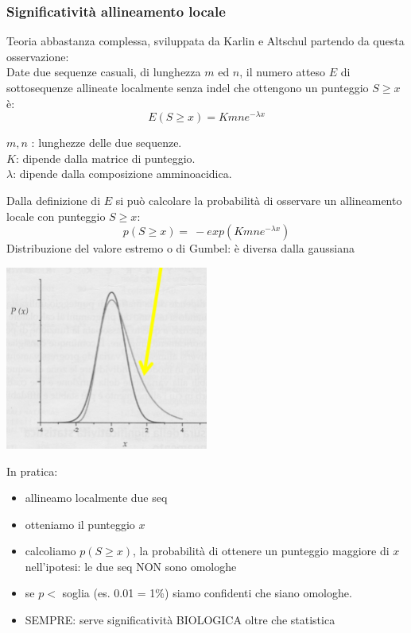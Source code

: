 \documentclass{article}
\begin{document}
\subsubsection{Significatività allineamento locale}
Teoria abbastanza complessa, sviluppata da Karlin e Altschul partendo da questa
osservazione:\\
Date due sequenze casuali, di lunghezza $m$ ed $n$, il numero atteso $E$ di
sottosequenze allineate localmente senza indel che ottengono un punteggio $S \geq x$ è:
$$E(S \geq x) = Kmne^{-\lambda x}$$
\begin{center}
    $m,n$ : lunghezze delle due sequenze.\\
    $K$: dipende dalla matrice di punteggio.\\
    $\lambda$: dipende dalla composizione amminoacidica.
\end{center}
Dalla definizione di $E$ si può calcolare la probabilità di osservare un
allineamento locale con punteggio $S \geq x$:
$$p(S \geq x) = \ - exp(Kmne^{- \lambda x})$$
Distribuzione del valore estremo o di Gumbel: è diversa dalla gaussiana
\begin{center}
    \includegraphics[width=0.5\textwidth]{figures/E.png}\\
\end{center}
In pratica:
\begin{itemize}
    \item allineamo localmente due seq
    \item otteniamo il punteggio $x$
    \item calcoliamo $p(S \geq x)$, la probabilità di
    ottenere un punteggio maggiore di $x$
    nell'ipotesi: le due seq NON sono
    omologhe
    \item se $p < $ soglia (es. 0.01 = 1\%) siamo
    confidenti che siano omologhe.
    \item SEMPRE: serve significatività
    BIOLOGICA oltre che statistica
\end{itemize}
\end{document}
